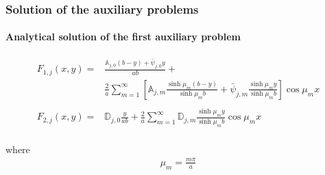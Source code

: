 \documentclass[aspectratio=169]{beamer}
\begin{document}
%					
%					
%					
%					
%
\begin{frame}
	\frametitle{Solution of the auxiliary problems}
	\framesubtitle{Analytical solution of the first auxiliary problem}
	
	\begin{alertblock}{}
		\begin{align*}
		F_{1, j}(x, y) = & \frac{\mathbb{A}_{j,0}(b - y) + \bar{\psi}_{j,0}y}{ab} + \nonumber \\
		&\frac{2}{a}\sum_{m=1}^\infty\left[\mathbb{A}_{j,m}\frac{\sinh\mu_m (b - y)}{\sinh\mu_m b} + \bar{\psi}_{j, m}\frac{\sinh\mu_m y}{\sinh\mu_m b}\right]\cos\mu_m x \\ \\
		F_{2, j}(x, y) = & \mathbb{D}_{j,0}\frac{y}{ab}  + \frac{2}{a}\sum_{m=1}^\infty\mathbb{D}_{j,m}\frac{\sinh\mu_m y}{\sinh\mu_m b} \cos\mu_m x \\
		\end{align*}
	\end{alertblock}	
	
	where
	\begin{align*}
	\mu_m = \frac{m \pi}{a}
	\end{align*}
	
\end{frame}
\end{document}
